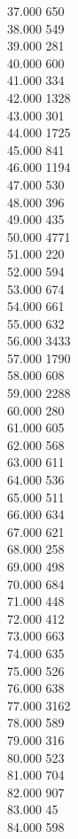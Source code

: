 { 37.000	650 \\
 38.000	549 \\
 39.000	281 \\
 40.000	600 \\
 41.000	334 \\
 42.000	1328 \\
 43.000	301 \\
 44.000	1725 \\
 45.000	841 \\
 46.000	1194 \\
 47.000	530 \\
 48.000	396 \\
 49.000	435 \\
 50.000	4771 \\
 51.000	220 \\
 52.000	594 \\
 53.000	674 \\
 54.000	661 \\
 55.000	632 \\
 56.000	3433 \\
 57.000	1790 \\
 58.000	608 \\
 59.000	2288 \\
 60.000	280 \\
 61.000	605 \\
 62.000	568 \\
 63.000	611 \\
 64.000	536 \\
 65.000	511 \\
 66.000	634 \\
 67.000	621 \\
 68.000	258 \\
 69.000	498 \\
 70.000	684 \\
 71.000	448 \\
 72.000	412 \\
 73.000	663 \\
 74.000	635 \\
 75.000	526 \\
 76.000	638 \\
 77.000	3162 \\
 78.000	589 \\
 79.000	316 \\
 80.000	523 \\
 81.000	704 \\
 82.000	907 \\
 83.000	45 \\
 84.000	598 \\
}
